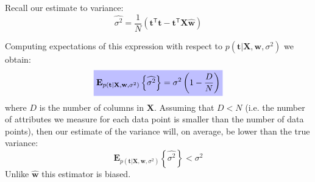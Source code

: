 Recall our estimate to variance:
\begin{equation}
\widehat{\sigma^2} = \frac{1}{N}
\left( \mathbf{t}^{\mathsf{T}}\mathbf{t} - 
\mathbf{t}^{\mathsf{T}}\mathbf{X}\widehat{\mathbf{w}}
\right)
\end{equation}

Computing expectations of this expression with respect to $p(\mathbf{t}|\mathbf{X},\mathbf{w},\sigma^2)$
we obtain:
\begin{equation}
\highlighteq{
\mathbf{E}_{p(\mathbf{t}|\mathbf{X},\mathbf{w},\sigma^2)}
\left\{\widehat{\sigma^2}\right\} =
\sigma^2 \left( 1 - \frac{D}{N} \right)
}
\end{equation}
where $D$ is the number of columns in $\mathbf{X}$. Assuming that $D < N$
(i.e. the number of attributes we measure for each data
point is smaller than the number of data points), then our estimate of the variance
will, on average, be lower than the true variance:
\begin{equation}
\mathbf{E}_{p(\mathbf{t}|\mathbf{X},\mathbf{w},\sigma^2)}
\left\{\widehat{\sigma^2}\right\} < \sigma^2
\end{equation}
Unlike $\widehat{\mathbf{w}}$ this estimator is biased.





